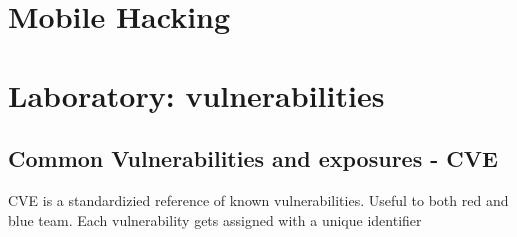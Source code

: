 \section{}

\chapter{Mobile Hacking}
\section{}

\chapter{Laboratory: vulnerabilities}
\section{Common Vulnerabilities and exposures - CVE}
CVE is a standardizied reference of known vulnerabilities. Useful to both red and blue team. Each vulnerability gets assigned with a unique identifier
